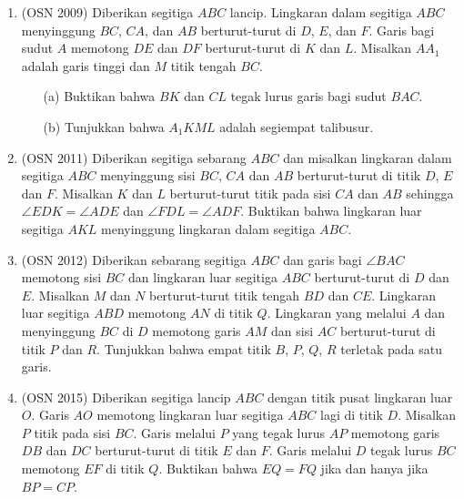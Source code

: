 \documentclass[11pt]{scrartcl}
\begin{document}
\begin{enumerate}
        \item (OSN 2009) Diberikan segitiga $ABC$ lancip. Lingkaran dalam segitiga $ABC$ menyinggung $BC$, $CA$, dan $AB$ berturut-turut di $D$, $E$, dan $F$. Garis bagi sudut $A$ memotong $DE$ dan $DF$ berturut-turut di $K$ dan $L$. Misalkan $AA_1$ adalah garis tinggi dan $M$ titik tengah $BC$.
        \begin{enumerate}
        \item[(a)] Buktikan bahwa $BK$ dan $CL$ tegak lurus garis bagi sudut $BAC$.
        \item[(b)] Tunjukkan bahwa $A_1KML$ adalah segiempat talibusur.
        \end{enumerate}
        
        \item (OSN 2011) Diberikan segitiga sebarang $ABC$ dan misalkan lingkaran dalam segitiga $ABC$ menyinggung sisi $BC$, $CA$ dan $AB$ berturut-turut di titik $D$, $E$ dan $F$. Misalkan $K$ dan $L$ berturut-turut titik pada sisi $CA$ dan $AB$ sehingga $\angle EDK = \angle ADE$ dan $\angle FDL = \angle ADF$. Buktikan bahwa lingkaran luar segitiga $AKL$ menyinggung lingkaran dalam segitiga $ABC$.
        
        \item (OSN 2012) Diberikan sebarang segitiga $ABC$ dan garis bagi $\angle BAC$ memotong sisi $BC$ dan lingkaran luar segitiga $ABC$ berturut-turut di $D$ dan $E$. Misalkan $M$ dan $N$ berturut-turut titik tengah $BD$ dan $CE$. Lingkaran luar segitiga $ABD$ memotong $AN$ di titik $Q$. Lingkaran yang melalui $A$ dan menyinggung $BC$ di $D$ memotong garis $AM$ dan sisi $AC$ berturut-turut di titik $P$ dan $R$. Tunjukkan bahwa empat titik $B$, $P$, $Q$, $R$ terletak pada satu garis.
        
        \item (OSN 2015) Diberikan segitiga lancip $ABC$ dengan titik pusat lingkaran luar $O$. Garis $AO$ memotong lingkaran luar segitiga $ABC$ lagi di titik $D$. Misalkan $P$ titik pada sisi $BC$. Garis melalui $P$ yang tegak lurus $AP$ memotong garis $DB$ dan $DC$ berturut-turut di titik $E$ dan $F$. Garis melalui $D$ tegak lurus $BC$ memotong $EF$ di titik $Q$. Buktikan bahwa $EQ = FQ$ jika dan hanya jika $BP = CP$.
    \end{enumerate}
\end{document}
